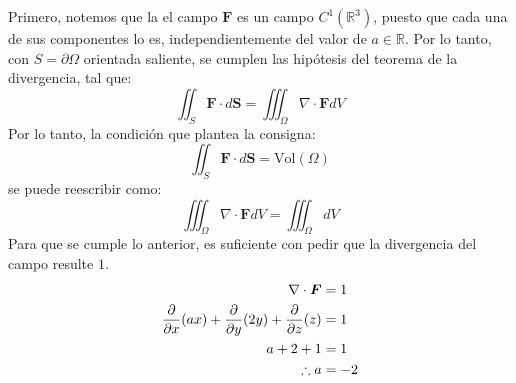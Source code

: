 \begin{solution}
    Primero, notemos que la el campo $\boldsymbol{F}$ es un campo $C^1(\mathbb{R}^3)$, puesto que
    cada una de sus componentes lo es, independientemente del valor de $a \in \mathbb{R}$.
    Por lo tanto, con $S = \partial \Omega$ orientada saliente, se cumplen las hipótesis del
    teorema de la divergencia, tal que:
    \begin{equation*}
        \iint_S \boldsymbol{F} \cdot d\boldsymbol{S} = \iiint_\Omega \nabla \cdot \boldsymbol{F} dV
    \end{equation*}
    Por lo tanto, la condición que plantea la consigna:
    \begin{equation*}
        \iint_S \boldsymbol{F} \cdot d\boldsymbol{S} = \text{Vol}(\Omega)
    \end{equation*}
    se puede reescribir como:
    \begin{equation*}
        \iiint_\Omega \nabla \cdot \boldsymbol{F} dV = \iiint_\Omega dV
    \end{equation*}
    Para que se cumple lo anterior, es suficiente con pedir que la divergencia del campo resulte $1$.
    \begin{align*}
        \nabla \cdot \boldsymbol{F} &= 1 \\
        \frac{\partial}{\partial x}(ax) + \frac{\partial}{\partial y}(2y) + \frac{\partial}{\partial z}(z) &= 1 \\
        a + 2 + 1 &= 1 \\
        \therefore a &= -2
    \end{align*}
\end{solution}